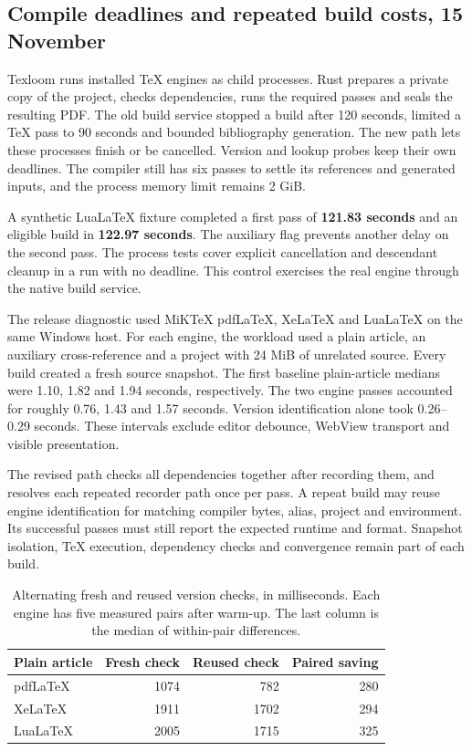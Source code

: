 \subsection{Compile deadlines and repeated build costs, 15 November}
\label{sec:compile-cost}
Texloom runs installed TeX engines as child processes. Rust prepares a
private copy of the project, checks dependencies, runs the required passes
and seals the resulting PDF. The old build service stopped a build after
120 seconds, limited a TeX pass to 90 seconds and bounded bibliography
generation. The new path lets these processes finish or be cancelled.
Version and lookup probes keep their own deadlines. The compiler still has
six passes to settle its references and generated inputs, and the process
memory limit remains 2 GiB.

A synthetic Lua\LaTeX{} fixture completed a first pass of
\textbf{121.83 seconds} and an eligible build in \textbf{122.97 seconds}.
The auxiliary flag prevents another delay on the second pass. The process
tests cover explicit cancellation and descendant cleanup in a run with
no deadline. This control exercises the real engine through the native
build service.

The release diagnostic used MiKTeX pdf\LaTeX{}, Xe\LaTeX{} and Lua\LaTeX{}
on the same Windows host. For each engine, the workload used a plain
article, an auxiliary cross-reference and a project with 24 MiB of unrelated
source. Every build created a fresh source snapshot. The first baseline
plain-article medians were 1.10, 1.82 and 1.94 seconds, respectively.
The two engine passes accounted for roughly 0.76, 1.43 and 1.57 seconds.
Version identification alone took 0.26--0.29 seconds. These intervals exclude
editor debounce, WebView transport and visible presentation.

The revised path checks all dependencies together after recording
them, and resolves each repeated recorder path once per pass. A repeat
build may reuse engine identification for matching compiler bytes, alias,
project and environment. Its successful passes must still report the
expected runtime and format. Snapshot isolation, TeX execution,
dependency checks and convergence remain part of each build.

\begin{table}[htbp]
\small\centering
\begin{tabular}{@{}lrrr@{}}
\toprule
Plain article & Fresh check & Reused check & Paired saving\\
\midrule
pdfLaTeX & 1074 & 782 & 280\\
XeLaTeX & 1911 & 1702 & 294\\
LuaLaTeX & 2005 & 1715 & 325\\
\bottomrule
\end{tabular}
\caption{Alternating fresh and reused version checks, in milliseconds.
Each engine has five measured pairs after warm-up. The last column is the
median of within-pair differences.}
\label{tab:compile-pairstats}
\end{table}

